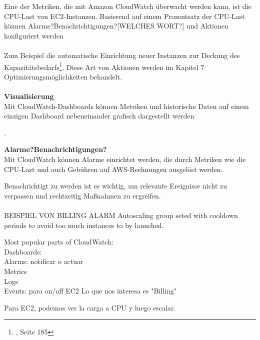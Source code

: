 Eine der Metriken, die mit Amazon CloudWatch überwacht werden kann, ist die CPU-Last von EC2-Instanzen. 
Basierend auf einem Prozentsatz der CPU-Last können Alarme?Benachrichtigungen?[WELCHES WORT?] und Aktionen konfiguriert werden
\\\\
Zum Beispiel die automatische Einrichtung neuer Instanzen zur Deckung des Kapazitätsbedarfs\footnote{\cite{AWS1}, Seite 185}. 
Diese Art von Aktionen werden im Kapitel 7 Optimierungsmöglichkeiten behandelt.
\\\\
\textbf{Visualisierung}\\
Mit CloudWatch-Dashboards können Metriken und historische Daten auf einem einzigen Dashboard nebeneinander grafisch dargestellt werden
{\cite{AWZ12}.

\textbf{Alarme?Benachrichtigungen?}\\
Mit CloudWatch können Alarme einrichtet werden, die durch Metriken wie die CPU-Last und auch Gebühren auf AWS-Rechnungen ausgelöst werden.

Benachrichtigt zu werden ist es wichtig, um relevante Ereignisse nicht zu verpassen und rechtzeitig Maßnahmen zu ergreifen.
\\\\
BEISPIEL VON BILLING ALARM
Autoscaling group seted with cooldown periods to avoid too much instances to by launched.




Most popular parts of CloudWatch:
\\
Dashboards:
\\
Alarms: notificar o actuar
\\
Metrics
\\
Logs
\\
Events: para on/off EC2
Lo que nos interesa es "Billing"


Para EC2, podemos ver la carga a CPU y luego escalar.

}
